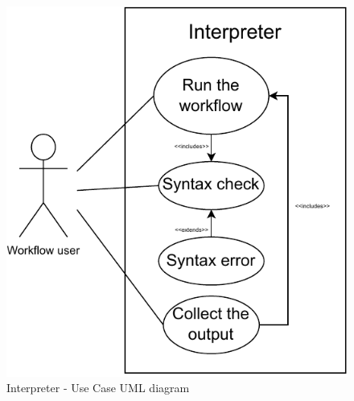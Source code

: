 
\begin{center}
\begin{figure}[h!]
    \begin{center}
        \includegraphics{./img/interpreterUC.pdf}
    \end{center}
    \caption{Interpreter - Use Case UML diagram}
\end{figure}
\end{center}